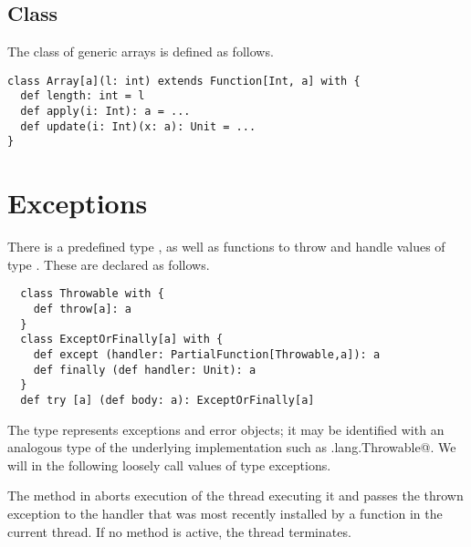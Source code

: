 \documentclass[11pt]{report}
\begin{document}
\subsection{Class }

The class of generic arrays is defined as follows.

\begin{verbatim}
class Array[a](l: int) extends Function[Int, a] with {
  def length: int = l
  def apply(i: Int): a = ...
  def update(i: Int)(x: a): Unit = ...
}
\end{verbatim}
\section{Exceptions}
\label{sec:exceptions}

There is a predefined type \verb@Throwable@, as well as functions to
throw and handle values of type \verb@Throwable@. These are declared
as follows.

\begin{verbatim}
  class Throwable with {
    def throw[a]: a
  }
  class ExceptOrFinally[a] with {
    def except (handler: PartialFunction[Throwable,a]): a
    def finally (def handler: Unit): a
  }
  def try [a] (def body: a): ExceptOrFinally[a]
\end{verbatim}

The type \verb@Throwable@ represents exceptions and error objects; it
may be identified with an analogous type of the underlying
implementation such as \verb@java.lang.Throwable@. We will in the
following loosely call values of type \verb@Throwable@ exceptions.

The \verb@throw@ method in \verb@Throwable@ aborts execution of the
thread executing it and passes the thrown exception to the handler
that was most recently installed by a
\verb@try@ function in the current thread. If no \verb@try@ method is
active, the thread terminates.
\end{document}
